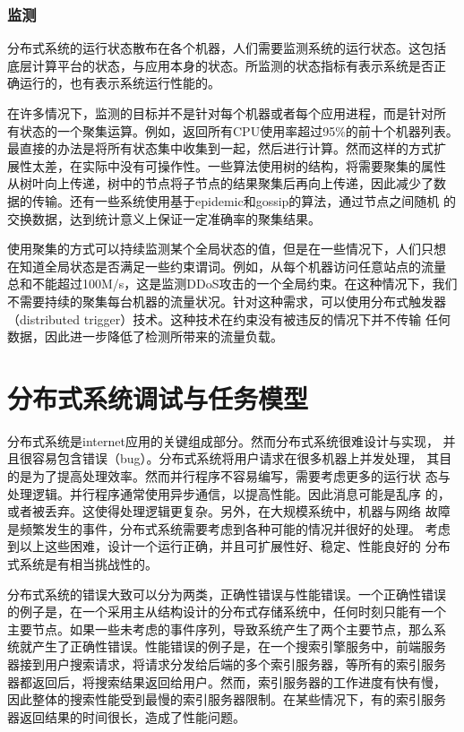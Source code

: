 \subsubsection*{监测}

分布式系统的运行状态散布在各个机器，人们需要监测系统的运行状态。这包括
底层计算平台的状态，与应用本身的状态。所监测的状态指标有表示系统是否正
确运行的，也有表示系统运行性能的。

在许多情况下，监测的目标并不是针对每个机器或者每个应用进程，而是针对所
有状态的一个聚集运算。例如，返回所有CPU使用率超过95\%的前十个机器列表。
最直接的办法是将所有状态集中收集到一起，然后进行计算。然而这样的方式扩
展性太差，在实际中没有可操作性。一些算法使用树的结构，将需要聚集的属性
从树叶向上传递，树中的节点将子节点的结果聚集后再向上传递，因此减少了数
据的传输。还有一些系统使用基于epidemic和gossip的算法，通过节点之间随机
的交换数据，达到统计意义上保证一定准确率的聚集结果。

使用聚集的方式可以持续监测某个全局状态的值，但是在一些情况下，人们只想
在知道全局状态是否满足一些约束谓词。例如，从每个机器访问任意站点的流量
总和不能超过100M/s，这是监测DDoS攻击的一个全局约束。在这种情况下，我们
不需要持续的聚集每台机器的流量状况。针对这种需求，可以使用分布式触发器
（distributed trigger）技术。这种技术在约束没有被违反的情况下并不传输
任何数据，因此进一步降低了检测所带来的流量负载。

\section{分布式系统调试与任务模型}

分布式系统是internet应用的关键组成部分。然而分布式系统很难设计与实现，
并且很容易包含错误（bug）。分布式系统将用户请求在很多机器上并发处理，
其目的是为了提高处理效率。然而并行程序不容易编写，需要考虑更多的运行状
态与处理逻辑。并行程序通常使用异步通信，以提高性能。因此消息可能是乱序
的，或者被丢弃。这使得处理逻辑更复杂。另外，在大规模系统中，机器与网络
故障是频繁发生的事件，分布式系统需要考虑到各种可能的情况并很好的处理。
考虑到以上这些困难，设计一个运行正确，并且可扩展性好、稳定、性能良好的
分布式系统是有相当挑战性的。

分布式系统的错误大致可以分为两类，正确性错误与性能错误。一个正确性错误
的例子是，在一个采用主从结构设计的分布式存储系统中，任何时刻只能有一个
主要节点。如果一些未考虑的事件序列，导致系统产生了两个主要节点，那么系
统就产生了正确性错误。性能错误的例子是，在一个搜索引擎服务中，前端服务
器接到用户搜索请求，将请求分发给后端的多个索引服务器，等所有的索引服务
器都返回后，将搜索结果返回给用户。然而，索引服务器的工作进度有快有慢，
因此整体的搜索性能受到最慢的索引服务器限制。在某些情况下，有的索引服务
器返回结果的时间很长，造成了性能问题。

